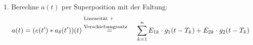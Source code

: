 \begin{enumerate}
  \item Berechne $a(t)$ per Superposition mit der Faltung:
    \[
      a(t) = (e(t')\ast a_\delta(t'))(t)
        \stackrel{\text{%
          \begin{minipage}{9em}Linearität +\\Verschiebungssatz\end{minipage}
        }}{=}
      \sum_{k=1}^n E_{1k}\cdot g_1(t-T_k) + E_{2k}\cdot g_2(t-T_k)
    \]
\end{enumerate}

